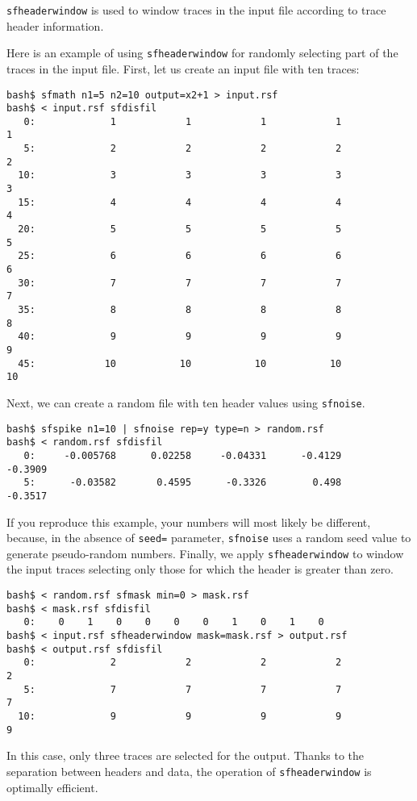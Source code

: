\noindent\doublebox{\parbox{\textwidth}{

}}

\texttt{sfheaderwindow} is used to window traces in the input file
according to trace header information. 

Here is an example of using \texttt{sfheaderwindow} for randomly
selecting part of the traces in the input file. First, let us create
an input file with ten traces:
\begin{verbatim}
bash$ sfmath n1=5 n2=10 output=x2+1 > input.rsf
bash$ < input.rsf sfdisfil
   0:             1            1            1            1            1
   5:             2            2            2            2            2
  10:             3            3            3            3            3
  15:             4            4            4            4            4
  20:             5            5            5            5            5
  25:             6            6            6            6            6
  30:             7            7            7            7            7
  35:             8            8            8            8            8
  40:             9            9            9            9            9
  45:            10           10           10           10           10
\end{verbatim}
Next, we can create a random file with ten header values using
\texttt{sfnoise}.
\begin{verbatim}
bash$ sfspike n1=10 | sfnoise rep=y type=n > random.rsf
bash$ < random.rsf sfdisfil
   0:     -0.005768      0.02258     -0.04331      -0.4129      -0.3909
   5:      -0.03582       0.4595      -0.3326        0.498      -0.3517
\end{verbatim}
If you reproduce this example, your numbers will most likely be different,
because, in the absence of \texttt{seed=} parameter, \texttt{sfnoise}
uses a random seed value to generate pseudo-random numbers. Finally,
we apply \texttt{sfheaderwindow} to window the input traces selecting
only those for which the header is greater than zero.
\begin{verbatim}
bash$ < random.rsf sfmask min=0 > mask.rsf
bash$ < mask.rsf sfdisfil
   0:    0    1    0    0    0    0    1    0    1    0
bash$ < input.rsf sfheaderwindow mask=mask.rsf > output.rsf
bash$ < output.rsf sfdisfil
   0:             2            2            2            2            2
   5:             7            7            7            7            7
  10:             9            9            9            9            9
\end{verbatim}
In this case, only three traces are selected for the output. Thanks to
the separation between headers and data, the operation of
\texttt{sfheaderwindow} is optimally efficient. 

